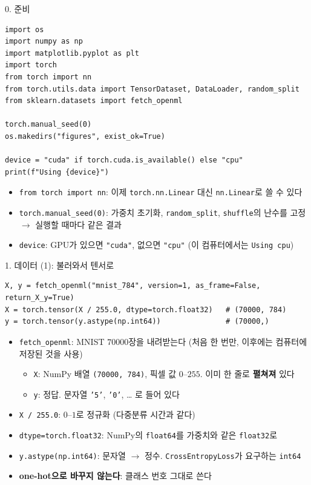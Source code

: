 \documentclass[aspectratio=169,11pt]{beamer}
\newcommand{\code}[1]{\texttt{#1}}
\begin{document}
\begin{frame}[fragile]{0. 준비}
\begin{lstlisting}
import os
import numpy as np
import matplotlib.pyplot as plt
import torch
from torch import nn
from torch.utils.data import TensorDataset, DataLoader, random_split
from sklearn.datasets import fetch_openml

torch.manual_seed(0)
os.makedirs("figures", exist_ok=True)

device = "cuda" if torch.cuda.is_available() else "cpu"
print(f"Using {device}")
\end{lstlisting}
\begin{itemize}
\item \code{from torch import nn}: 이제 \code{torch.nn.Linear} 대신 \code{nn.Linear}로 쓸 수 있다
\item \code{torch.manual\_seed(0)}: 가중치 초기화, \code{random\_split}, \code{shuffle}의 난수를 고정 $\to$ 실행할 때마다 같은 결과
\item \code{device}: GPU가 있으면 \code{"cuda"}, 없으면 \code{"cpu"} (이 컴퓨터에서는 \code{Using cpu})
\end{itemize}
\end{frame}

\begin{frame}[fragile]{1. 데이터 (1): 불러와서 텐서로}
\begin{lstlisting}
X, y = fetch_openml("mnist_784", version=1, as_frame=False, return_X_y=True)
X = torch.tensor(X / 255.0, dtype=torch.float32)   # (70000, 784)
y = torch.tensor(y.astype(np.int64))               # (70000,)
\end{lstlisting}
\begin{itemize}
\item \code{fetch\_openml}: MNIST $70000$장을 내려받는다 (처음 한 번만, 이후에는 컴퓨터에 저장된 것을 사용)
\begin{itemize}
\item \code{X}: NumPy 배열 \code{(70000, 784)}, 픽셀 값 $0$--$255$. 이미 한 줄로 \textbf{펼쳐져} 있다
\item \code{y}: 정답. 문자열 \code{'5'}, \code{'0'}, \ldots{} 로 들어 있다
\end{itemize}
\item \code{X / 255.0}: $0$--$1$로 정규화 (다중분류 시간과 같다)
\item \code{dtype=torch.float32}: NumPy의 \code{float64}를 가중치와 같은 \code{float32}로
\item \code{y.astype(np.int64)}: 문자열 $\to$ 정수. \code{CrossEntropyLoss}가 요구하는 \code{int64}
\item \textbf{one-hot으로 바꾸지 않는다}: 클래스 번호 그대로 쓴다
\end{itemize}
\end{frame}
\end{document}
